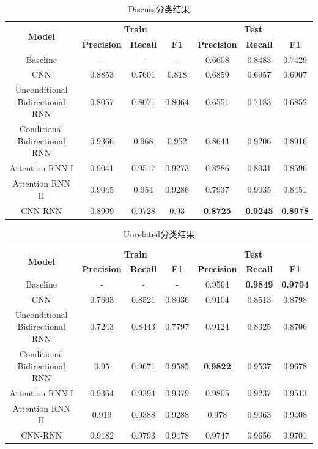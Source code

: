 \documentclass[a4paper]{article}
\begin{document}
	\begin{table}[H]
		\centering
		\caption{Discuss分类结果}
		\label{discuss}
		\begin{tabular}{@{}ccccccc@{}}
			\toprule
			\multirow{2}{*}{\textbf{Model}} & \multicolumn{3}{c}{\textbf{Train}} & \multicolumn{3}{c}{\textbf{Test}} \\ \cmidrule(l){2-7} 
			& \textbf{Precision}       & \textbf{Recall}      & \textbf{F1}      & \textbf{Precision}      & \textbf{Recall}      & \textbf{F1}      \\ \cmidrule(l){1-7}
			Baseline & -& -& -& 0.6608 & 0.8483 & 0.7429 \\
			CNN&0.8853&0.7601&0.818&0.6859&0.6957&0.6907\\
			Unconditional Bidirectional RNN&0.8057&0.8071&0.8064&0.6551&0.7183&0.6852\\
			Conditional Bidirectional RNN&0.9366&0.968&0.952&0.8644&0.9206&0.8916\\
			Attention RNN I&0.9041&0.9517&0.9273&0.8286&0.8931&0.8596\\
			Attention RNN II&0.9045&0.954&0.9286&0.7937&0.9035&0.8451\\
			CNN-RNN&0.8909&0.9728&0.93&\textbf{0.8725}&\textbf{0.9245}&\textbf{0.8978}\\
			\bottomrule
		\end{tabular}
	\end{table}
	\begin{table}[H]
		\centering
		\caption{Unrelated分类结果}
		\label{unrelated}
		\begin{tabular}{@{}ccccccc@{}}
			\toprule
			\multirow{2}{*}{\textbf{Model}} & \multicolumn{3}{c}{\textbf{Train}} & \multicolumn{3}{c}{\textbf{Test}} \\ \cmidrule(l){2-7} 
			& \textbf{Precision}       & \textbf{Recall}      & \textbf{F1}      & \textbf{Precision}      & \textbf{Recall}      & \textbf{F1}      \\ \cmidrule(l){1-7}
			Baseline & -& -& -& 0.9564 & \textbf{0.9849} & \textbf{0.9704} \\
			CNN&0.7603&0.8521&0.8036&0.9104&0.8513&0.8798\\
			Unconditional Bidirectional RNN&0.7243&0.8443&0.7797&0.9124&0.8325&0.8706\\
			Conditional Bidirectional RNN&0.95&0.9671&0.9585&\textbf{0.9822}&0.9537&0.9678\\
			Attention RNN I&0.9364&0.9394&0.9379&0.9805&0.9237&0.9513\\
			Attention RNN II&0.919&0.9388&0.9288&0.978&0.9063&0.9408\\
			CNN-RNN&0.9182&0.9793&0.9478&0.9747&0.9656&0.9701\\
			\bottomrule
		\end{tabular}
	\end{table}
\end{document}
